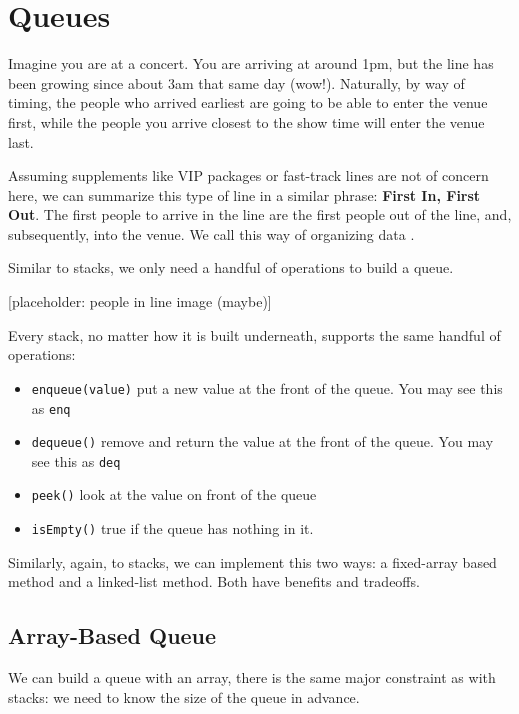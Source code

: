 \chapter{Queues}

Imagine you are at a concert. You are arriving at around 1pm, but the line has been growing since about 3am that same day (wow!). Naturally, by way of timing, the people who arrived earliest are going to be able to enter the venue first, while the people you arrive closest to the show time will enter the venue last. 

Assuming supplements like VIP packages or fast-track lines are not of concern here, we can summarize this type of line in a similar phrase: \textbf{First In, First Out}. The first people to arrive in the line are the first people out of the line, and, subsequently, into the venue. We call this way of organizing data .

Similar to stacks, we only need a handful of operations to build a queue.

[placeholder: people in line image (maybe)]

Every stack, no matter how it is built underneath, supports the same handful of operations:

\begin{itemize}
    \item \texttt{enqueue(value)} put a new value at the front of the queue. You may see this as \texttt{enq}
    \item \texttt{dequeue()} remove and return the value at the front of the queue. You may see this as \texttt{deq}
    \item \texttt{peek()} look at the value on front of the queue
    \item \texttt{isEmpty()} true if the queue has nothing in it.
\end{itemize}

Similarly, again, to stacks, we can implement this two ways: a fixed-array based method and a linked-list method. Both have benefits and tradeoffs. 


\section{Array-Based Queue}
We can build a queue with an array, there is the same major constraint as with stacks: we need to know the size of the queue in advance. 

